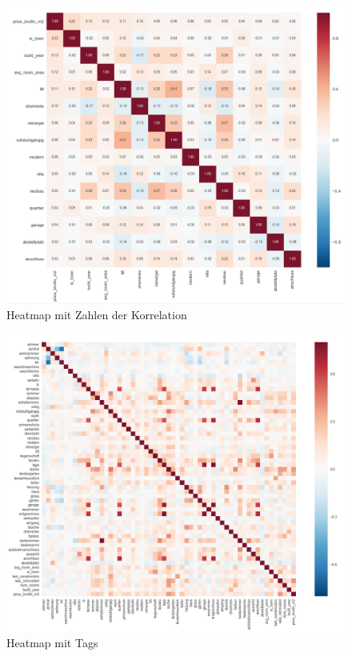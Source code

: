 \begin{figure}[h]
  \centering
  \includegraphics[width=\linewidth]{images/anhang/analysis/HeatMap_Importance.png}
  \caption{Heatmap mit Zahlen der Korrelation}
  \end{figure}

\begin{figure}[h]
  \centering
  \includegraphics[width=\linewidth]{images/anhang/analysis/HeatMap_all.png}
  \caption{Heatmap mit Tags}
\end{figure}

